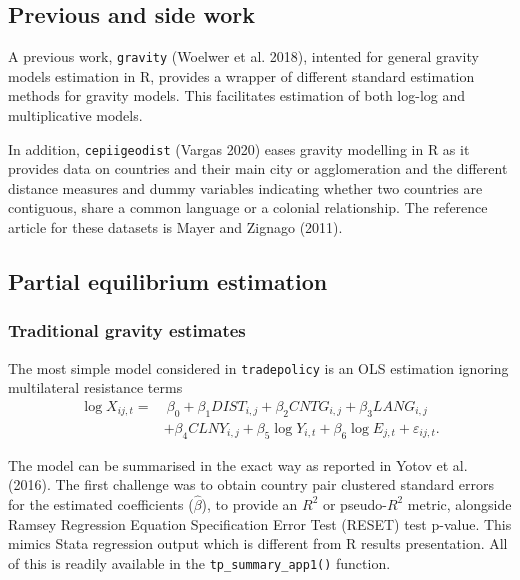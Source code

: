 \documentclass[12pt,reqno,oneside,pdftex]{formato-puc/puctesis} %
\begin{document}
\hypertarget{previous-and-side-work}{%
\subsection{Previous and side work}\label{previous-and-side-work}}

A previous work, \texttt{gravity} (Woelwer et al. 2018), intented for
general gravity models estimation in R, provides a wrapper of different
standard estimation methods for gravity models. This facilitates
estimation of both log-log and multiplicative models.

In addition, \texttt{cepiigeodist} (Vargas 2020) eases gravity modelling
in R as it provides data on countries and their main city or
agglomeration and the different distance measures and dummy variables
indicating whether two countries are contiguous, share a common language
or a colonial relationship. The reference article for these datasets is
Mayer and Zignago (2011).

\hypertarget{partial-equilibrium-estimation}{%
\subsection{Partial equilibrium
estimation}\label{partial-equilibrium-estimation}}

\hypertarget{traditional-gravity-estimates}{%
\subsubsection{Traditional gravity
estimates}\label{traditional-gravity-estimates}}

The most simple model considered in \texttt{tradepolicy} is an OLS
estimation ignoring multilateral resistance terms \begin{align}
\log X_{ij,t} =& \:\beta_0 + \beta_1 DIST_{i,j} + \beta_2 CNTG_{i,j} + \beta_3 LANG_{i,j}\\ 
\text{ }& + \beta_4 CLNY_{i,j} + \beta_5 \log Y_{i,t} + \beta_6 \log E_{j,t} + \varepsilon_{ij,t}.
\end{align}

The model can be summarised in the exact way as reported in Yotov et al.
(2016). The first challenge was to obtain country pair clustered
standard errors for the estimated coefficients (\(\hat{\beta}\)), to
provide an \(R^2\) or pseudo-\(R^2\) metric, alongside Ramsey Regression
Equation Specification Error Test (RESET) test p-value. This mimics
Stata regression output which is different from R results presentation.
All of this is readily available in the \texttt{tp\_summary\_app1()}
function.
\end{document}
